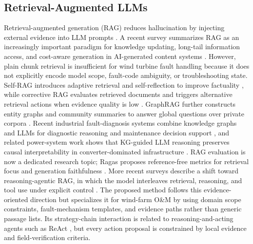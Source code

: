 \documentclass[lettersize,journal]{IEEEtran}
\begin{document}
\subsection{Retrieval-Augmented LLMs}
Retrieval-augmented generation (RAG) reduces hallucination by injecting external evidence into LLM prompts \cite{lewis2020rag}. A recent survey summarizes RAG as an increasingly important paradigm for knowledge updating, long-tail information access, and cost-aware generation in AI-generated content systems \cite{zhao2024ragSurvey}. However, plain chunk retrieval is insufficient for wind turbine fault handling because it does not explicitly encode model scope, fault-code ambiguity, or troubleshooting state. Self-RAG introduces adaptive retrieval and self-reflection to improve factuality \cite{asai2023selfrag}, while corrective RAG evaluates retrieved documents and triggers alternative retrieval actions when evidence quality is low \cite{yan2024crag}. GraphRAG further constructs entity graphs and community summaries to answer global questions over private corpora \cite{edge2024graphrag}. Recent industrial fault-diagnosis systems combine knowledge graphs and LLMs for diagnostic reasoning and maintenance decision support \cite{ma2026fdrkgllm}, and related power-system work shows that KG-guided LLM reasoning preserves causal interpretability in converter-dominated infrastructure \cite{lan2025kgllmhvdc}. RAG evaluation is now a dedicated research topic; Ragas proposes reference-free metrics for retrieval focus and generation faithfulness \cite{es2023ragas}. More recent surveys describe a shift toward reasoning-agentic RAG, in which the model interleaves retrieval, reasoning, and tool use under explicit control \cite{liang2025reasoningrag}. The proposed method follows this evidence-oriented direction but specializes it for wind-farm O\&M by using domain scope constraints, fault-mechanism templates, and evidence paths rather than generic passage lists. Its strategy-chain interaction is related to reasoning-and-acting agents such as ReAct \cite{yao2023react}, but every action proposal is constrained by local evidence and field-verification criteria.
\end{document}
